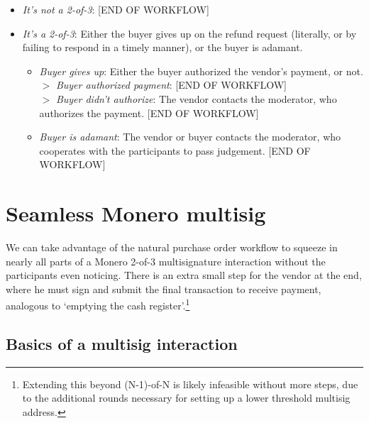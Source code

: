\begin{enumerate}
\begin{itemize}
\begin{enumerate}
\begin{itemize}
\begin{itemize}
                    \item {\em It's not a 2-of-3}: [END OF WORKFLOW]
                    \item {\em It's a 2-of-3}: Either the buyer gives up on the refund request (literally, or by failing to respond in a timely manner), or the buyer is adamant.
                    \begin{itemize}
                        \item {\em Buyer gives up}: Either the buyer authorized the vendor's payment, or not.\\
                        $>$ {\em Buyer authorized payment}: [END OF WORKFLOW]\\
                        $>$ {\em Buyer didn't authorize}: The vendor contacts the moderator, who authorizes the payment. [END OF WORKFLOW]
                        \item {\em Buyer is adamant}: The vendor or buyer contacts the moderator, who cooperates with the participants to pass judgement. [END OF WORKFLOW]
                    \end{itemize}{}
                \end{itemize}
            \end{itemize}{}
        \end{enumerate}{}
    \end{itemize}{}
\end{enumerate}{}



\section{Seamless Monero multisig}
\label{sec:escrowed-marketplace-seamless-multisig}

We can take advantage of the natural purchase order workflow to squeeze in nearly all parts of a Monero 2-of-3 multisignature interaction without the participants even noticing. There is an extra small step for the vendor at the end, where he must sign and submit the final transaction to receive payment, analogous to `emptying the cash register'.\footnote{Extending this beyond (N-1)-of-N is likely infeasible without more steps, due to the additional rounds necessary for setting up a lower threshold multisig address.}


\subsection{Basics of a multisig interaction}
\label{subsec:escrowed-marketplace-multisig-interaction-basics}

